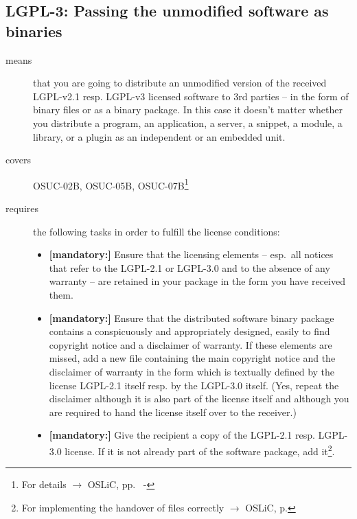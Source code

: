 \subsection{LGPL-3: Passing the unmodified software as binaries} 
\label{OSUC-02B-LGPL} \label{OSUC-05B-LGPL} \label{OSUC-07B-LGPL} 

\begin{description}
\item[means] that you are going to distribute an unmodified version of the
received LGPL-v2.1 resp. LGPL-v3 licensed software to 3rd parties -- in the form
of binary files or as a bi\-na\-ry package. In this case it doesn't matter
whether you distribute a program, an application, a server, a snippet, a module,
a library, or a plugin as an independent or an embedded unit.

\item[covers] OSUC-02B, OSUC-05B, OSUC-07B\footnote{For details $\rightarrow$ OSLiC, pp.\
\pageref{OSUC-02B-DEF} - \pageref{OSUC-07B-DEF}}

\item[requires] the following tasks in order to fulfill the license conditions:
\begin{itemize}
  
  \item \textbf{[mandatory:]} Ensure that the licensing elements -- esp.\ all
  notices that refer to the LGPL-2.1 or LGPL-3.0 and to the absence of any
  warranty -- are retained in your package in the form you have received them.

  \item \textbf{[mandatory:]} Ensure that the distributed software binary
  package contains a conspicuously and appropriately designed, easily to find
  copyright notice and a disclaimer of warranty. If these elements are missed,
  add a new file containing the main copyright notice and the disclaimer of
  warranty in the form which is textually defined by the license LGPL-2.1 itself
  resp. by the LGPL-3.0 itself. (Yes, repeat the disclaimer although it is also
  part of the license itself and although you are required to hand the license
  itself over to the receiver.)
  
  \item \textbf{[mandatory:]} Give the recipient a copy of the LGPL-2.1 resp.
  LGPL-3.0 license. If it is not already part of the software package, add
  it\footnote{For implementing the handover of files correctly $\rightarrow$
  OSLiC, p. \pageref{DistributingFilesHint}}.
  

\end{itemize}
\end{description}
